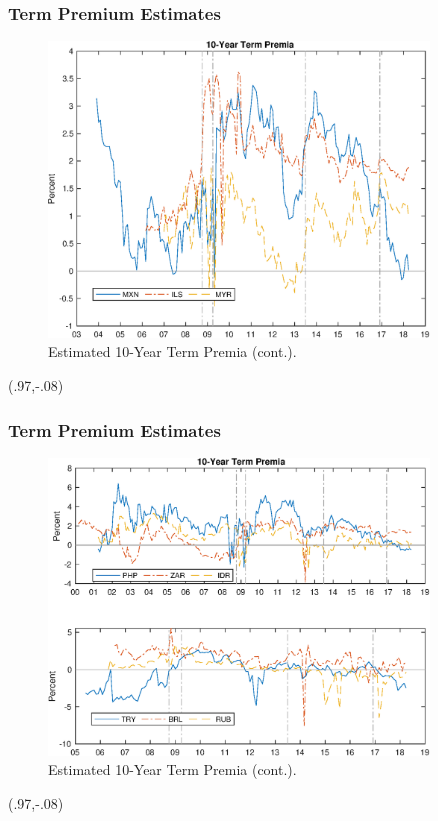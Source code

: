 \documentclass[12pt, xcolor=dvipsnames]{beamer} 			         %
\begin{document}
\begin{frame}[label=tp_10yrB]
	\frametitle{Term Premium Estimates}
	\begin{figure}[!htbp]
		\begin{center}
			\includegraphics[width=0.9\textwidth,height=0.65\textheight]{../Figures/rp_10yr_3}
			\par\end{center}
		\caption{Estimated 10-Year Term Premia (cont.).}\label{fig:tp_10yrB}
	\end{figure}
	\begin{textblock*}{3cm}(.97\textwidth,-.08\textheight)
		\hyperlink{tp_10yrA}{}
	\end{textblock*}
\end{frame}

\begin{frame}
	\frametitle{Term Premium Estimates}
	\begin{figure}[!htbp]
		\begin{center}
			\includegraphics[width=0.9\textwidth,height=0.65\textheight]{../Figures/rp_10yr_2}
			\par\end{center}
		\caption{Estimated 10-Year Term Premia (cont.).}\label{fig:tp_10yrC}
	\end{figure}
	\begin{textblock*}{3cm}(.97\textwidth,-.08\textheight)
		\hyperlink{tp_10yrA}{}
	\end{textblock*}
\end{frame}
\end{document}
